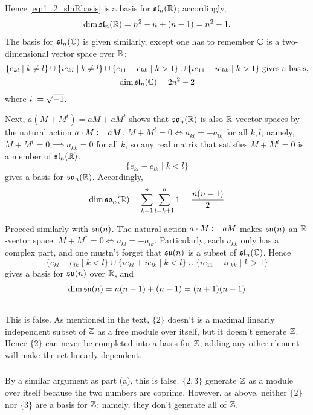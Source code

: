\documentclass[12pt]{article}
\begin{document}
Hence \eqref{eq:1_2_slnRbasis} is a basis for $\mathfrak{sl}_{n}(\mathbb{R})$; 
accordingly, 
$$\dim{\mathfrak{sl}_{n}(\mathbb{R})} = n^2 - n + (n - 1) = n^2 - 1.$$
The basis for $\mathfrak{sl}_{n}(\mathbb{C})$ is given similarly, except one has to remember $\mathbb{C}$ is a two-dimensional vector space over $\mathbb{R}$: 
\begin{gather*}
  \{e_{kl} \mid k \neq l\} \cup \{i e_{kl} \mid k \neq l\} \cup \{e_{11} - e_{kk} \mid k > 1\} \cup \{ie_{11} - ie_{kk} \mid k > 1\} \text{ gives a basis,}\\ 
  \dim{\mathfrak{sl}_{n}(\mathbb{C})} = 2n^2 - 2
\end{gather*}
where $i \vcentcolon= \sqrt{-1}$. 

Next, $a(M + M^{t}) = aM + aM^{t}$ shows that $\mathfrak{so}_{n}(\mathbb{R})$ is also $\mathbb{R}$-vecctor spaces by the natural action $a \cdot M \vcentcolon= aM$. 
$M + M^{t} = 0 \iff a_{kl} = -a_{lk}$ for all $k, l$; 
namely, $M + M^{t} = 0 \implies a_{kk} = 0$ for all $k$, so any real matrix that satisfies $M + M^{t} = 0$ is a member of $\mathfrak{sl}_{n}(\mathbb{R})$. 
$$\{e_{kl} - e_{lk} \mid k < l\}$$ 
gives a basis for $\mathfrak{so}_{n}(\mathbb{R})$. 
Accordingly, 
$$\dim{\mathfrak{so}_{n}(\mathbb{R})} = \sum_{k = 1}^{n} \sum_{l = k + 1}^{n} 1 = \frac{n(n - 1)}{2}$$

Proceed similarly with $\mathfrak{su}(n)$. 
The natural action $a \cdot M \vcentcolon= aM$ makes $\mathfrak{su}(n)$ an $\mathbb{R}$-vector space. 
$M + M^{*} = 0 \iff a_{kl} = -\overline{a_{lk}}$. 
Particularly, each $a_{kk}$ only has a complex part, and one mustn't forget that $\mathfrak{su}(n)$ is a subset of $\mathfrak{sl}_{n}(\mathbb{C})$.  
Hence
$$\{e_{kl} - e_{lk} \mid k < l\} \cup \{ie_{kl} + ie_{lk} \mid k < l\} \cup \{ie_{11} - ie_{kk} \mid k > 1\}$$ 
gives a basis for $\mathfrak{su}(n)$ over $\mathbb{R}$, and 
$$\dim{\mathfrak{su}(n)} = n(n - 1) + (n - 1) = (n + 1)(n - 1)$$

\setcounter{subsection}{4} 

\subsection{} 
\subsubsection{} 
This is false. 
As mentioned in the text, $\{2\}$ doesn't is a maximal linearly independent subset of $\mathbb{Z}$ as a free module over itself, but it doesn't generate $\mathbb{Z}$. 
Hence $\{2\}$ can never be completed into a basis for $\mathbb{Z}$; 
adding any other element will make the set linearly dependent.  

\subsubsection{} 
By a similar argument as part (a), this is false. 
$\{2, 3\}$ generate $\mathbb{Z}$ as a module over itself because the two numbers are coprime. 
However, as above, neither $\{2\}$ nor $\{3\}$ are a basis for $\mathbb{Z}$; 
namely, they don't generate all of $\mathbb{Z}$. 
\end{document}
